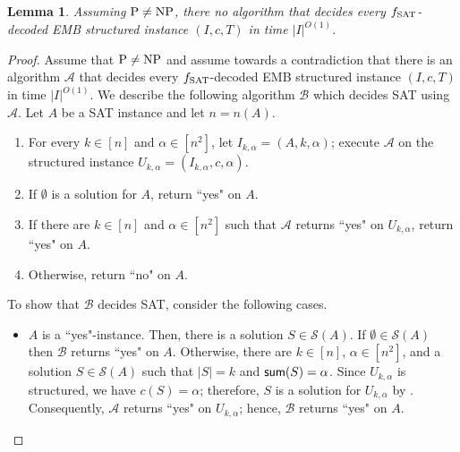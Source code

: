 \documentclass[11pt,letter]{article}
\newcommand{\cA}{{\mathcal{A}}}
\newcommand{\cB}{{\mathcal{B}}}
\newcommand{\fs}{f_{\textnormal{SAT}}}
\newcommand{\io}{|I|^{O(1)}}
\newtheorem{lemma}{Lemma}[section]
\begin{document}
		\begin{lemma}
				\label{lem:SAT}
				Assuming $\textnormal{P} \neq \textnormal{NP}$, there no algorithm that decides every $\fs$-decoded \textnormal{EMB} structured instance $(I,c,T)$ in time $\io$. 
			\end{lemma}
	\begin{proof}
	
	Assume that $\textnormal{P} \neq \textnormal{NP}$ and assume towards a contradiction that there is an algorithm $\cA$ that decides every $\fs$-decoded EMB structured instance $(I,c,T)$ in time $\io$. We describe the following algorithm $\cB$ which decides SAT using $\cA$. Let $A$ be a SAT instance and let $n = n(A)$. 
	\begin{enumerate}
		\item 	For every $k \in \left[n\right]$ and $\alpha \in \left[n^2\right]$, let $I_{k,\alpha} = (A,k,\alpha)$; execute $\cA$ on the structured instance $U_{k,\alpha} = (I_{k,\alpha},c,\alpha)$. %
		\item  If $\emptyset$ is a solution for $A$,  return ``yes" on $A$. 
		\item If there are $k \in \left[n\right]$ and $\alpha \in \left[n^2\right]$ such that $\cA$ returns ``yes" on $U_{k,\alpha}$, %
	 return ``yes" on $A$. %
	 \item Otherwise, return ``no" on $A$. %
	\end{enumerate}
	To show that $\cB$ decides SAT, consider the following cases. 
	\begin{itemize}
		\item $A$ is a ``yes"-instance. Then, there is a solution $S \in \mathcal{S}(A)$. If $\emptyset \in \mathcal{S}(A)$ then $\cB$ returns ``yes" on $A$. Otherwise, there are $k \in [n]$, $\alpha \in \left[n^2\right]$, and a solution $S \in \mathcal{S}(A)$ such that $|S| = k$ and $ \textnormal{\textsf{sum}}(S) = \alpha$. Since $U_{k,\alpha}$ is structured, we have $c(S) = \alpha$; therefore, $S$ is a solution for $U_{k,\alpha}$ by . Consequently, $\cA$ returns ``yes" on $U_{k,\alpha}$; hence, $\cB$ returns ``yes" on $A$.  
		
	
		

\end{itemize}
\end{proof}
\end{document}
